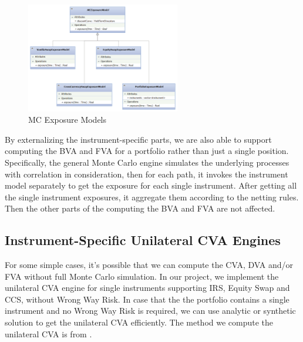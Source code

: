 \begin{figure}[h]
  \centering
  \includegraphics[width=0.6\textwidth]{mcexposure.png}
  \caption{MC Exposure Models}
  \label{fig:mcexposure}
\end{figure}

By externalizing the instrument-specific parts, we are also able to support computing the BVA and FVA for a portfolio rather than just a single position. Specifically, the general Monte Carlo engine simulates the underlying processes with correlation in consideration, then for each path, it invokes the instrument model separately to get the exposure for each single instrument. After getting all the single instrument exposures, it aggregate them according to the netting rules. Then the other parts of the computing the BVA and FVA are not affected.

\subsection{Instrument-Specific Unilateral CVA Engines}

For some simple cases, it's possible that we can compute the CVA, DVA and/or FVA without full Monte Carlo simulation. In our project, we implement the unilateral CVA engine for single instruments supporting IRS, Equity Swap and CCS, without Wrong Way Risk. In case that the the portfolio contains a single instrument and no Wrong Way Risk is required, we can use analytic or synthetic solution to get the unilateral CVA efficiently. The method we compute the unilateral CVA is from \cite{brigobook}. 
